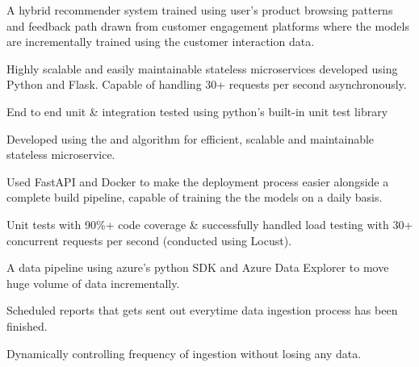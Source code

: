 \vspace{\topsep}


 \textbullet{}  \textbullet{}  \textbullet{}  

\begin{tightemize}
\item A hybrid recommender system trained using user's product browsing patterns and feedback path drawn from customer engagement platforms where the models are incrementally trained using the customer interaction data.
\item Highly scalable and easily maintainable stateless microservices developed using Python and Flask. Capable of handling 30+ requests per second asynchronously.
\item End to end unit \& integration tested using python's built-in unit test library
\end{tightemize}


 \textbullet{}  \textbullet{}  \textbullet{}  \textbullet{} 

\begin{tightemize}
\item Developed using the  and  algorithm for efficient, scalable and maintainable stateless microservice.
\item Used FastAPI and Docker to make the deployment process easier alongside a complete build pipeline, capable of training the the models on a daily basis.
\item Unit tests with 90\%+ code coverage \& successfully handled load testing with 30+ concurrent requests per second (conducted using Locust).
\end{tightemize}


 \textbullet{}  \textbullet{} 

\begin{tightemize}
\item A data pipeline using azure's python SDK and Azure Data Explorer to move huge volume of data incrementally.
\item Scheduled reports that gets sent out everytime data ingestion process has been finished.
\item Dynamically controlling frequency of ingestion without losing any data.
\end{tightemize}